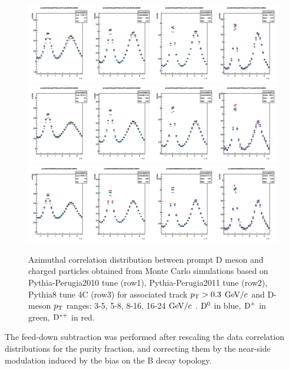 \begin{figure}
\centering
\includegraphics[width=1\linewidth]{figures/Template/1DCompare_allDpTfromC_AssoPt_0dot3to99dot0GeVc_Perugia2010.png}
\includegraphics[width=1\linewidth]{figures/Template/1DCompare_allDpTfromC_AssoPt_0dot3to99dot0GeVc_Perugia2011.png}
\includegraphics[width=1\linewidth]{figures/Template/1DCompare_allDpTfromC_AssoPt_0dot3to99dot0GeVc_Pythia8.png}
\caption{Azimuthal correlation distribution between prompt D meson and charged particles obtained from Monte Carlo simulations
based on Pythia-Perugia2010 tune (row1), Pythia-Perugia2011 tune (row2), Pythia8 tune 4C (row3) for associated track $p_{\rm T} > 0.3$ $\mathrm{GeV}/c$  and D-meson $p_{\rm T}$ ranges: 3-5, 5-8, 8-16, 16-24 $\mathrm{GeV}/c$ . ${\rm D^0}$ in blue, ${\rm D^+}$ in green, ${\rm D^{*+}}$ in red.}
\label{templates2}
\end{figure}

The feed-down subtraction was performed after rescaling the data correlation distributions for the purity fraction, and correcting them by the near-side modulation induced by the bias on the B decay topology.

\clearpage

\newpage %


